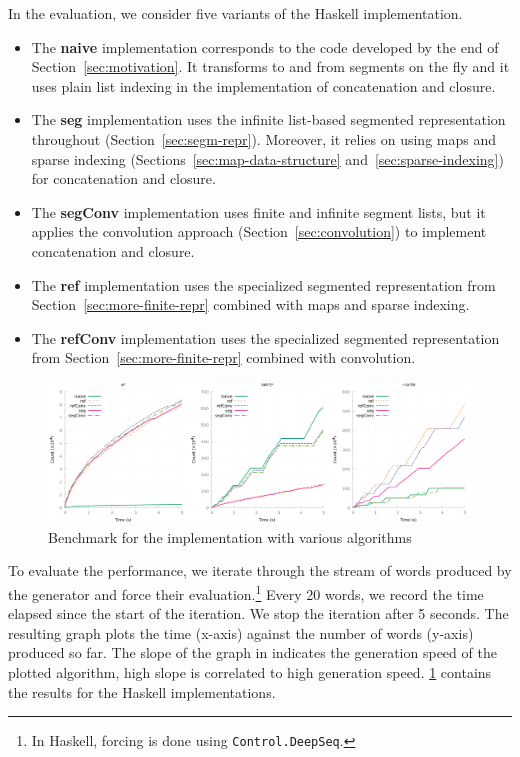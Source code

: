 In the evaluation, we consider five variants of the Haskell implementation.
\begin{itemize}
\item The \textbf{naive} implementation corresponds to the code developed by
  the end of Section~\ref{sec:motivation}. It transforms to and from
  segments on the fly and it uses plain list indexing in the
  implementation of concatenation and closure.
\item The \textbf{seg} implementation uses the infinite list-based segmented
  representation throughout (Section~\ref{sec:segm-repr}). Moreover,
  it relies on using maps and sparse indexing
  (Sections~\ref{sec:map-data-structure} and~\ref{sec:sparse-indexing})
  for concatenation and closure.
\item The \textbf{segConv} implementation uses finite and infinite
  segment lists, but it applies the convolution approach
  (Section~\ref{sec:convolution}) to implement concatenation and
  closure.
\item The \textbf{ref} implementation uses the specialized segmented
  representation from Section~\ref{sec:more-finite-repr} combined with
  maps and sparse indexing.
\item The \textbf{refConv} implementation uses the specialized
  segmented representation from Section~\ref{sec:more-finite-repr}
  combined with convolution.
\end{itemize}

\begin{figure}[tp]
  \centering
  \includegraphics[height=0.33\linewidth]{measure/haskell_all.png}
  \caption{Benchmark for the \haskell implementation with various algorithms}
  \label{bench:haskell:all}
\end{figure}
To evaluate the performance, we iterate through the stream of words
produced by the generator and force their evaluation.\footnote{In
  Haskell, forcing is done using \lstinline{Control.DeepSeq}.} Every
20 words, we record the time elapsed since the start of the iteration. We
stop the iteration after 5 seconds. The resulting graph plots the time (x-axis) against the number of words (y-axis) produced so far. The slope of the graph in indicates the generation speed of the plotted algorithm, high slope is correlated to high generation speed.  \cref{bench:haskell:all} contains the results for the Haskell implementations.

